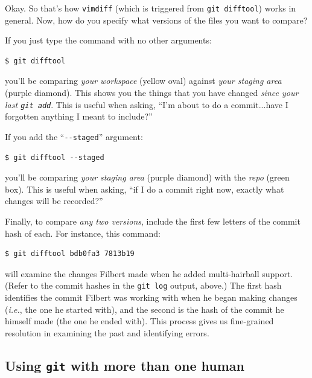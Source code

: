 Okay. So that's how \texttt{vimdiff} (which is triggered from \texttt{git
difftool}) works in general. Now, how do you specify what versions of the
files you want to compare?

If you just type the command with no other arguments:

\begin{Verbatim}[fontsize=\small,samepage=true,frame=none]
$ git difftool
\end{Verbatim}

you'll be comparing \textit{your workspace} (yellow oval) against \textit{your
staging area} (purple diamond). This shows you the things that you have
changed \textit{since your last \texttt{git add}}. This is useful when asking,
``I'm about to do a commit...have I forgotten anything I meant to include?''

If you add the ``\texttt{-{}-staged}'' argument:

\begin{Verbatim}[fontsize=\small,samepage=true,frame=none]
$ git difftool --staged
\end{Verbatim}

you'll be comparing \textit{your staging area} (purple diamond) with the
\textit{repo} (green box). This is useful when asking, ``if I do a commit
right now, exactly what changes will be recorded?''

Finally, to compare \textit{any two versions}, include the first few letters
of the commit hash of each. For instance, this command:

\begin{Verbatim}[fontsize=\small,samepage=true,frame=none]
$ git difftool bdb0fa3 7813b19
\end{Verbatim}

will examine the changes Filbert made when he added multi-hairball support.
(Refer to the commit hashes in the \texttt{git log} output, above.) The first
hash identifies the commit Filbert was working with when he began making
changes (\textit{i.e.}, the one he started with), and the second is the hash
of the commit he himself made (the one he ended with). This process gives us
fine-grained resolution in examining the past and identifying errors.



\subsection{Using \texttt{git} with more than one human}

